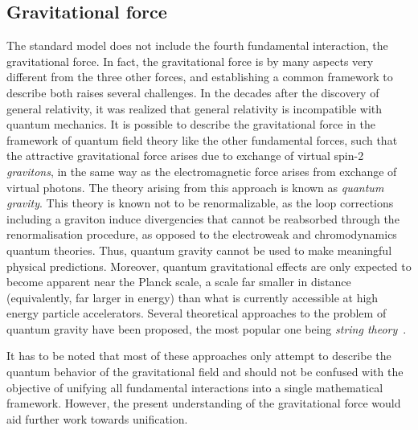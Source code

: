 \subsection*{Gravitational force}

The standard model does not include the fourth fundamental interaction, the gravitational force.
In fact, the gravitational force is by many aspects very different from the three other forces, and establishing a common framework to describe both raises several challenges.
In the decades after the discovery of general relativity, it was realized that general relativity is incompatible with quantum mechanics.
It is possible to describe the gravitational force in the framework of quantum field theory like the other fundamental forces, such that the attractive gravitational force arises due to exchange of virtual spin-2 \textit{gravitons}, in the same way as the electromagnetic force arises from exchange of virtual photons. The theory arising from this approach is known as \textit{quantum gravity}.
This theory is known not to be renormalizable, as the loop corrections including a graviton induce divergencies that cannot be reabsorbed through the renormalisation procedure, as opposed to the electroweak and chromodynamics quantum theories. Thus, quantum gravity cannot be used to make meaningful physical predictions.
Moreover, quantum gravitational effects are only expected to become apparent near the Planck scale, a scale far smaller in distance (equivalently, far larger in energy) than what is currently accessible at high energy particle accelerators.
Several theoretical approaches to the problem of quantum gravity have been proposed, the most popular one being \textit{string theory}~\cite{StringTheory}.

It has to be noted that most of these approaches only attempt to describe the quantum behavior of the gravitational field and should not be confused with the objective of unifying all fundamental interactions into a single mathematical framework. However, the present understanding of the gravitational force would aid further work towards unification.

